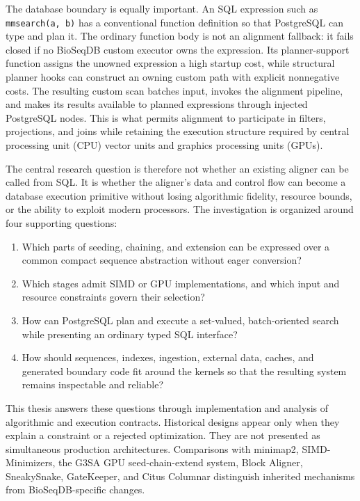     The database boundary is equally important.  An SQL expression such
    as \texttt{mmsearch(a, b)} has a conventional function definition so
    that PostgreSQL can type and plan it.  The ordinary function body is not
    an alignment fallback: it fails closed if no BioSeqDB custom executor
    owns the expression.  Its planner-support function assigns the unowned
    expression a high startup cost, while structural planner hooks can
    construct an owning custom path with explicit nonnegative costs.  The
    resulting custom scan batches input,
    invokes the alignment pipeline, and makes its results available to
    planned expressions through injected PostgreSQL nodes.  This is what
    permits alignment to participate in filters, projections, and joins
    while retaining the execution structure required by central processing
    unit (CPU) vector units
    and graphics processing units (GPUs).

    The central research question is therefore not whether an existing
    aligner can be called from SQL.  It is whether the aligner's data and
    control flow can become a database execution primitive without
    losing algorithmic fidelity, resource bounds, or the ability to
    exploit modern processors.  The investigation is organized around
    four supporting questions:

    \begin{enumerate}
        \item[\textbf{RQ1.}] Which parts of seeding, chaining, and extension can be expressed
        over a common compact sequence abstraction without eager conversion?
        \item[\textbf{RQ2.}] Which stages admit SIMD or GPU implementations, and
        which input and resource constraints govern their selection?
        \item[\textbf{RQ3.}] How can PostgreSQL plan and execute a set-valued,
        batch-oriented search while presenting an ordinary typed SQL
        interface?
        \item[\textbf{RQ4.}] How should sequences, indexes, ingestion, external data,
        caches, and generated boundary code fit around the kernels so
        that the resulting system remains inspectable and reliable?
    \end{enumerate}

    This thesis answers these questions through implementation and analysis of
    algorithmic and execution contracts. Historical designs appear only when they explain a
    constraint or a rejected optimization. They are not presented as
    simultaneous production architectures. Comparisons with minimap2,
    SIMD-Minimizers, the G3SA GPU seed-chain-extend system, Block Aligner, SneakySnake,
    GateKeeper, and Citus
    Columnar distinguish inherited mechanisms from BioSeqDB-specific
    changes.


